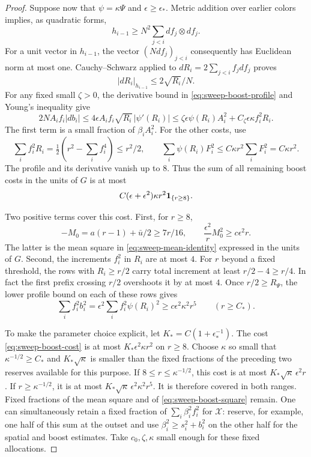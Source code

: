 \begin{proof}
Suppose now that \(\psi=\kappa\Psi\) and
\(\epsilon\ge\epsilon_*\).  Metric addition over earlier
colors implies, as quadratic forms,
\[
 h_{i-1}\ge N^2\sum_{j<i}df_j\otimes df_j .
\]
For a unit vector in \(h_{i-1}\), the vector
\((Ndf_j)_{j<i}\) consequently has Euclidean norm at most one.
Cauchy--Schwarz applied to
\(dR_i=2\sum_{j<i}f_jdf_j\) proves
\begin{equation}
 |dR_i|_{h_{i-1}}\le2\sqrt{R_i}/N .
 \label{eq:sweep-prefix-gradient}
\end{equation}
For any fixed small \(\zeta>0\), the derivative bound in
\eqref{eq:sweep-boost-profile} and Young's inequality give
\[
 2NA_if_i|db_i|
 \le4\epsilon A_if_i\sqrt{R_i}\,|\psi'(R_i)|
 \le\zeta\epsilon\psi(R_i)A_i^2
          +C_\zeta\epsilon\kappa f_i^2R_i .
\]
The first term is a small fraction of \(\beta_iA_i^2\).
For the other costs, use
\[
 \sum_i f_i^2R_i
       =\tfrac12\left(r^2-\sum_i f_i^4\right)\le r^2/2,
 \qquad
 \sum_i\psi(R_i)F_i^2\le C\kappa r^2\sum_iF_i^2=C\kappa r^2.
\]
The profile and its derivative vanish up to \(8\).  Thus the
sum of all remaining boost costs in the units of \(G\) is at
most
\begin{equation}
 C(\epsilon+\epsilon^2)\kappa r^2\mathbf 1_{\{r\ge8\}}.
 \label{eq:sweep-boost-cost}
\end{equation}

Two positive terms cover this cost.  First, for \(r\ge8\),
\[
 -M_0=a(r-1)+\bar u/2\ge7r/16,
 \qquad
 \frac{\epsilon^2}{r}M_0^2\ge c\epsilon^2r .
\]
The latter is the mean square in
\eqref{eq:sweep-mean-identity} expressed in the units of \(G\).
Second, the increments \(f_i^2\) in \(R_i\) are at most \(4\).
For \(r\) beyond a fixed threshold, the rows with
\(R_i\ge r/2\) carry total increment at least
\(r/2-4\ge r/4\).  In fact the first prefix crossing \(r/2\)
overshoots it by at most \(4\).  Once \(r/2\ge R_\Psi\), the
lower profile bound on each of these rows gives
\begin{equation}
 \sum_i f_i^2 b_i^2
   =\epsilon^2\sum_i f_i^2\psi(R_i)^2
       \ge c\epsilon^2\kappa^2 r^5
       \qquad(r\ge C_*).
 \label{eq:sweep-boost-square}
\end{equation}

To make the parameter choice explicit, let
\(K_*=C(1+\epsilon_*^{-1})\).  The cost
\eqref{eq:sweep-boost-cost} is at most
\(K_*\epsilon^2\kappa r^2\) on \(r\ge8\).
Choose \(\kappa\) so small that
\(\kappa^{-1/2}\ge C_*\) and \(K_*\sqrt\kappa\) is smaller
than the fixed fractions of the preceding two reserves
available for this purpose.  If
\(8\le r\le\kappa^{-1/2}\), this cost is at most
\(K_*\sqrt\kappa\,\epsilon^2r\).  If
\(r\ge\kappa^{-1/2}\), it is at most
\(K_*\sqrt\kappa\,\epsilon^2\kappa^2r^5\).
It is therefore covered in both ranges.  Fixed fractions of
the mean square and of \eqref{eq:sweep-boost-square} remain.
One can simultaneously retain a fixed fraction of
\(\sum_i\beta_i^2f_i^2\) for \(\mathcal X\): reserve, for
example, one half of this sum at the outset and use
\(\beta_i^2\ge s_i^2+b_i^2\) on the other half for the
spatial and boost estimates.  Take \(c_0,\zeta,\kappa\) small
enough for these fixed allocations.


\end{proof}
